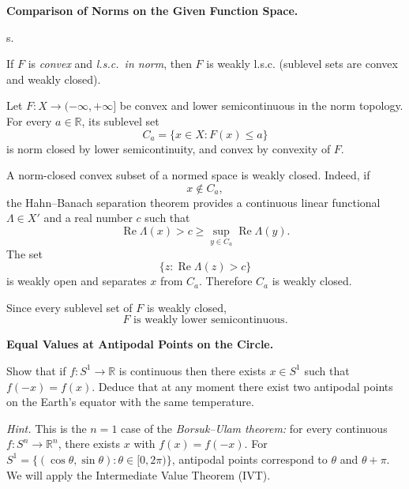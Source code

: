 \begin{problem}[CP-II-0497]
\label{prob:cp-ii-0497}
\textbf{Comparison of Norms on the Given Function Space.}

\hspace*{1.5em}s.

If $F$ is \emph{convex} and \emph{l.s.c.\ in norm}, then $F$ is weakly l.s.c.
		(sublevel sets are convex and weakly closed).
\end{problem}

\begin{solution}
Let \(F:X\to(-\infty,+\infty]\) be convex and lower semicontinuous in the norm topology.
For every \(a\in\mathbb R\), its sublevel set
\[
C_a=\{x\in X:F(x)\le a\}
\]
is norm closed by lower semicontinuity, and convex by convexity of \(F\).

A norm-closed convex subset of a normed space is weakly closed. Indeed, if
\[
x\notin C_a,
\]
the Hahn--Banach separation theorem provides a continuous linear functional
\(\Lambda\in X'\) and a real number \(c\) such that
\[
\operatorname{Re}\Lambda(x)>c
\ge
\sup_{y\in C_a}\operatorname{Re}\Lambda(y).
\]
The set
\[
\{z:\operatorname{Re}\Lambda(z)>c\}
\]
is weakly open and separates \(x\) from \(C_a\). Therefore \(C_a\) is weakly closed.

Since every sublevel set of \(F\) is weakly closed,
\[
\boxed{
F\text{ is weakly lower semicontinuous}.
}
\]
\end{solution}


\begin{problem}[CP-II-0501]
\label{prob:cp-ii-0501}
\textbf{Equal Values at Antipodal Points on the Circle.}

\hspace*{1.5em}Show that if $f:S^1\to\mathbb{R}$ is continuous then there exists $x\in S^1$
	such that $f(-x)=f(x)$.
	Deduce that at any moment there exist two antipodal points on the Earth's equator
	with the same temperature.


	\emph{Hint.} This is the $n=1$ case of the \emph{Borsuk--Ulam theorem:}
	for every continuous $f:S^n\to\mathbb{R}^n$, there exists $x$ with $f(x)=f(-x)$.
	For $S^1=\{(\cos\theta,\sin\theta):\theta\in[0,2\pi)\}$,
	antipodal points correspond to $\theta$ and $\theta+\pi$.
	We will apply the Intermediate Value Theorem (IVT).

\end{problem}

